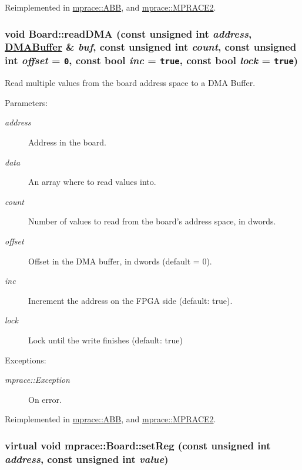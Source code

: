 Reimplemented in \hyperlink{classmprace_1_1ABB_a7}{mprace::ABB}, and \hyperlink{classmprace_1_1MPRACE2_a5}{mprace::MPRACE2}.\hypertarget{classmprace_1_1Board_a8}{
\subsubsection[readDMA]{\setlength{\rightskip}{0pt plus 5cm}void Board::read\-DMA (const unsigned int {\em address}, \hyperlink{classmprace_1_1DMABuffer}{DMABuffer} \& {\em buf}, const unsigned int {\em count}, const unsigned int {\em offset} = {\tt 0}, const bool {\em inc} = {\tt true}, const bool {\em lock} = {\tt true})}}
\label{classmprace_1_1Board_a8}


Read multiple values from the board address space to a DMA Buffer. 

\begin{Desc}
\item[Parameters:]
\begin{description}
\item[{\em address}]Address in the board. \item[{\em data}]An array where to read values into. \item[{\em count}]Number of values to read from the board's address space, in dwords. \item[{\em offset}]Offset in the DMA buffer, in dwords (default = 0). \item[{\em inc}]Increment the address on the FPGA side (default: true). \item[{\em lock}]Lock until the write finishes (default: true) \end{description}
\end{Desc}
\begin{Desc}
\item[Exceptions:]
\begin{description}
\item[{\em mprace::Exception}]On error.\end{description}
\end{Desc}


Reimplemented in \hyperlink{classmprace_1_1ABB_a9}{mprace::ABB}, and \hyperlink{classmprace_1_1MPRACE2_a7}{mprace::MPRACE2}.\hypertarget{classmprace_1_1Board_a1}{
\subsubsection[setReg]{\setlength{\rightskip}{0pt plus 5cm}virtual void mprace::Board::set\-Reg (const unsigned int {\em address}, const unsigned int {\em value})}}
\label{classmprace_1_1Board_a1}


